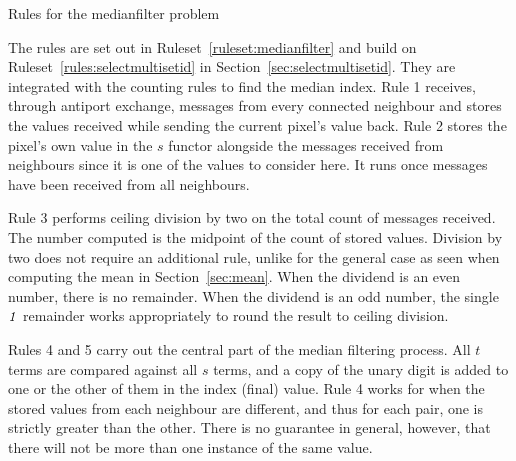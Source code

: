 \begin{cprulesetfloat}[t]
\begin{cpruleset}
%
%
%
%

%
\end{cpruleset}
\caption{\label{ruleset:medianfilter}Rules for the \gls{medianfilter} problem}
\end{cprulesetfloat}

The rules are set out in Ruleset~\ref{ruleset:medianfilter} and build on Ruleset~\ref{rules:selectmultisetid} in Section~\ref{sec:selectmultisetid}.  They are integrated with the counting rules to find the median index.   Rule 1 receives, through antiport exchange, messages from every connected neighbour and stores the values received while sending the current pixel's value back.  Rule 2 stores the pixel's own value in the \(s\) functor alongside the messages received from neighbours since it is one of the values to consider here.  It runs once messages have been received from all neighbours.

Rule 3 performs ceiling division by two on the total count of messages received.  The number computed is the midpoint of the count of stored values.  Division by two does not require an additional rule, unlike for the general case as seen when computing the mean in Section~\ref{sec:mean}.  When the dividend is an even number, there is no remainder.  When the dividend is an odd number, the single \(\mathit{1}\) remainder works appropriately to round the result to ceiling division.

Rules 4 and 5 carry out the central part of the median filtering process.  All \(t\) terms are compared against all \(s\) terms, and a copy of the unary digit is added to one or the other of them in the index (final) value.
Rule 4 works for when the stored values from each neighbour are different, and thus for each pair, one is strictly greater than the other.   There is no guarantee in general, however, that there will not be more than one instance of the same value.

